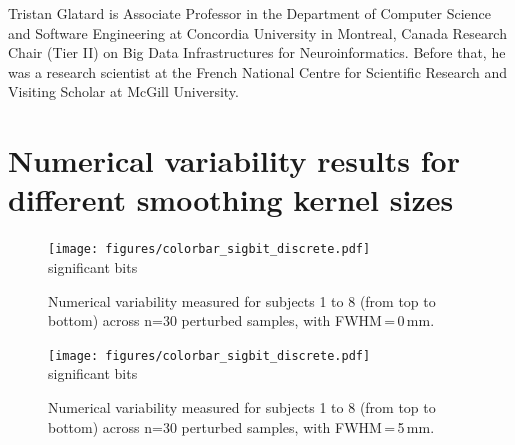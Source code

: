 \documentclass[lettersize,journal]{IEEEtran}
\begin{document}
\begin{IEEEbiography}{Tristan Glatard} is Associate Professor in the Department of Computer Science and
  Software Engineering at Concordia University in Montreal, Canada
  Research Chair (Tier II) on Big Data Infrastructures for Neuroinformatics.
  Before that, he was a research scientist at the French National Centre for
  Scientific Research and Visiting Scholar at McGill University.
\end{IEEEbiography}

\vfill

\appendix

\section*{Numerical variability results for different smoothing kernel sizes}
\label{appendix:numerical_uncertainty}

\begin{figure}[h]
  \centering
  \vspace*{-20pt}\hspace{15pt}
  \texttt{[image: figures/colorbar\_sigbit\_discrete.pdf]} \\
  \vspace*{-5pt}
  significant bits
  \caption{Numerical variability measured for subjects 1 to 8 (from top to bottom) across n=30 perturbed samples, with FWHM\,=\,0\,mm. }
  \label{fig:uncertainty-maps-0mm-disc}
\end{figure}

\begin{figure}
  \centering
  \vspace*{-20pt}\hspace{15pt}
  \texttt{[image: figures/colorbar\_sigbit\_discrete.pdf]} \\
  \vspace*{-5pt}
  significant bits
  \caption{Numerical variability measured for subjects 1 to 8 (from top to bottom) across n=30 perturbed samples, with FWHM\,=\,5\,mm. }
  \label{fig:uncertainty-maps-5mm-disc}
\end{figure}
\end{document}
